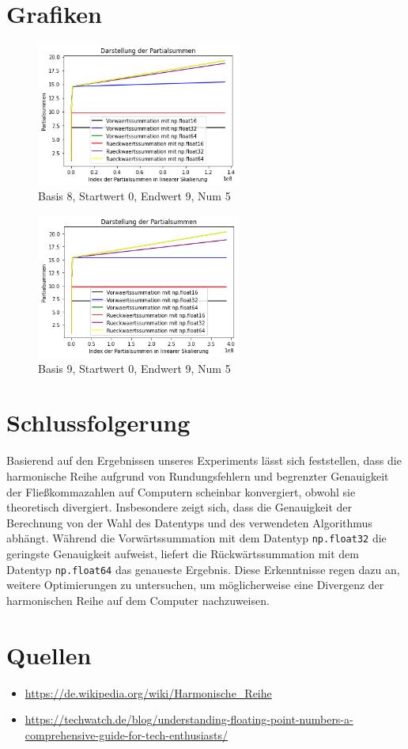 \documentclass{scrartcl}
\begin{document}
\newpage
\section{Grafiken}

\begin{figure}[h]
    \centering
    \includegraphics[width=0.6\textwidth]{plot_basis8_endwert9.png}
    \caption{Basis 8, Startwert 0, Endwert 9, Num 5}
\end{figure}

\begin{figure}[h]
    \centering
    \includegraphics[width=0.6\textwidth]{plot_basis9_endwert9.png}
    \caption{Basis 9, Startwert 0, Endwert 9, Num 5}
\end{figure}

\newpage
\section{Schlussfolgerung}
Basierend auf den Ergebnissen unseres Experiments lässt sich feststellen, dass die harmonische Reihe aufgrund von Rundungsfehlern und begrenzter Genauigkeit der Fließkommazahlen auf Computern scheinbar konvergiert, obwohl sie theoretisch divergiert. Insbesondere zeigt sich, dass die Genauigkeit der Berechnung von der Wahl des Datentyps und des verwendeten Algorithmus abhängt. Während die Vorwärtssummation mit dem Datentyp \texttt{np.float32} die geringste Genauigkeit aufweist, liefert die Rückwärtssummation mit dem Datentyp \texttt{np.float64} das genaueste Ergebnis. Diese Erkenntnisse regen dazu an, weitere Optimierungen zu untersuchen, um möglicherweise eine Divergenz der harmonischen Reihe auf dem Computer nachzuweisen.

\section{Quellen}
\begin{itemize}
\item \url{https://de.wikipedia.org/wiki/Harmonische_Reihe}
\item \url{https://techwatch.de/blog/understanding-floating-point-numbers-a-comprehensive-guide-for-tech-enthusiasts/}

\end{itemize}
\end{document}

